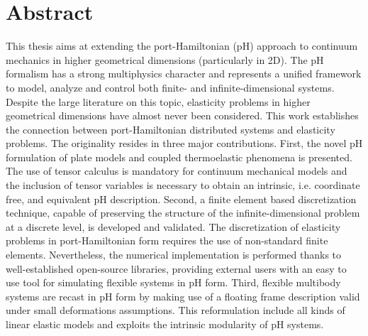 \chapter*{Abstract}

This thesis aims at extending the port-Hamiltonian (pH) approach to continuum mechanics in higher geometrical dimensions (particularly in 2D). The pH formalism has a strong multiphysics character and represents a unified framework to model, analyze and control both finite- and infinite-dimensional systems. Despite the large literature on this topic, elasticity problems in higher geometrical dimensions have almost never been considered.  This work establishes the connection between port-Hamiltonian distributed systems and elasticity problems. The originality resides in three major contributions. First, the novel pH formulation of plate models and coupled thermoelastic phenomena is presented. The use of tensor calculus is mandatory for continuum mechanical models and the inclusion of tensor variables is necessary to obtain an intrinsic, i.e. coordinate free, and equivalent pH description. Second, a finite element based discretization technique, capable of preserving the structure of the infinite-dimensional problem at a discrete level, is developed and validated. The discretization of elasticity problems in port-Hamiltonian form requires the use of non-standard finite elements. Nevertheless, the numerical implementation is performed thanks to well-established open-source libraries, providing external users with an easy to use tool for simulating flexible systems in pH form. Third, flexible multibody systems are recast in pH form by making use of a floating frame description valid under small deformations assumptions. This reformulation include all kinds of linear elastic models and exploits the intrinsic modularity of pH systems.   \\\\